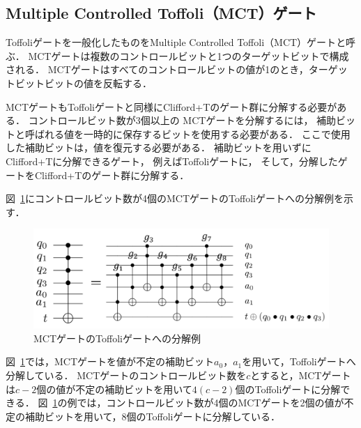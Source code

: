\subsection{Multiple Controlled Toffoli（MCT）ゲート}
Toffoliゲートを一般化したものをMultiple Controlled Toffoli（MCT）ゲート\cite{barenco1995elementary}と呼ぶ．
MCTゲートは複数のコントロールビットと1つのターゲットビットで構成される．
MCTゲートはすべてのコントロールビットの値が1のとき，ターゲットビットビットの値を反転する．
\par
MCTゲートもToffoliゲートと同様にClifford+Tのゲート群に分解する必要がある．
コントロールビット数が3個以上の
MCTゲートを分解するには，
補助ビットと呼ばれる値を一時的に保存するビットを使用する必要がある．
ここで使用した補助ビットは，値を復元する必要がある．
補助ビットを用いずにClifford+Tに分解できるゲート，
例えばToffoliゲートに，
そして，分解したゲートをClifford+Tのゲート群に分解する．
\par
図~\ref{barenco}にコントロールビット数が4個のMCTゲートのToffoliゲートへの分解例を示す．
\begin{figure}[tbp]
  \centering
  \includegraphics[width=13cm]{img/barenco.pdf}
  \caption{MCTゲートのToffoliゲートへの分解例}
  \label{barenco}
\end{figure}
図~\ref{barenco}では，MCTゲートを値が不定の補助ビット$a_{0}，a_{1}$を用いて，Toffoliゲートへ分解している．
MCTゲートのコントロールビット数を$c$とすると，MCTゲートは$c-2$個の値が不定の補助ビットを用いて$4(c-2)$個のToffoliゲートに分解できる\cite{barenco1995elementary}．
図~\ref{barenco}の例では，コントロールビット数が4個のMCTゲートを2個の値が不定の補助ビットを用いて，8個のToffoliゲートに分解している．

